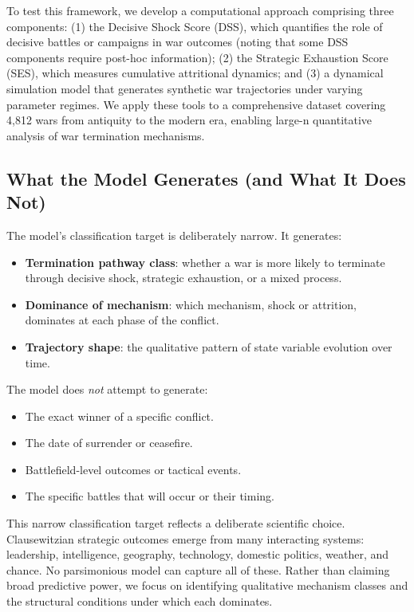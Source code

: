 To test this framework, we develop a computational approach comprising three components: (1) the Decisive Shock Score (DSS), which quantifies the role of decisive battles or campaigns in war outcomes (noting that some DSS components require post-hoc information); (2) the Strategic Exhaustion Score (SES), which measures cumulative attritional dynamics; and (3) a dynamical simulation model that generates synthetic war trajectories under varying parameter regimes. We apply these tools to a comprehensive dataset covering 4,812 wars from antiquity to the modern era, enabling large-n quantitative analysis of war termination mechanisms.

\subsection{What the Model Generates (and What It Does Not)}

The model's classification target is deliberately narrow. It generates:

\begin{itemize}
    \item \textbf{Termination pathway class}: whether a war is more likely to terminate through decisive shock, strategic exhaustion, or a mixed process.
    \item \textbf{Dominance of mechanism}: which mechanism, shock or attrition, dominates at each phase of the conflict.
    \item \textbf{Trajectory shape}: the qualitative pattern of state variable evolution over time.
\end{itemize}

The model does \emph{not} attempt to generate:

\begin{itemize}
    \item The exact winner of a specific conflict.
    \item The date of surrender or ceasefire.
    \item Battlefield-level outcomes or tactical events.
    \item The specific battles that will occur or their timing.
\end{itemize}

This narrow classification target reflects a deliberate scientific choice. Clausewitzian strategic outcomes emerge from many interacting systems: leadership, intelligence, geography, technology, domestic politics, weather, and chance. No parsimonious model can capture all of these. Rather than claiming broad predictive power, we focus on identifying qualitative mechanism classes and the structural conditions under which each dominates.

